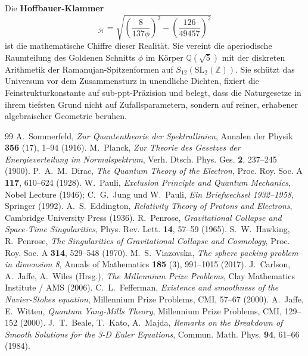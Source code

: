 \documentclass[11pt,a4paper]{article}
\theoremstyle{definition}
\theoremstyle{remark}
\numberwithin{equation}{section}
\begin{document}
Die \textbf{Hoffbauer-Klammer}
\begin{equation}
[D_r, D_t]_{\mathcal{H}} = \sqrt{\left(\frac{8}{137\phi}\right)^2 - \left(\frac{126}{49457}\right)^2}
\end{equation}
ist die mathematische Chiffre dieser Realität. Sie vereint die aperiodische Raumteilung des Goldenen Schnitts $\phi$ im Körper $\mathbb{Q}(\sqrt{5})$ mit der diskreten Arithmetik der Ramanujan-Spitzenformen auf $S_{12}(\mathrm{SL}_2(\mathbb{Z}))$. Sie schützt das Universum vor dem Zusammensturz in unendliche Dichten, fixiert die Feinstrukturkonstante auf sub-ppt-Präzision und belegt, dass die Naturgesetze in ihrem tiefsten Grund nicht auf Zufallsparametern, sondern auf reiner, erhabener algebraischer Geometrie beruhen.

\begin{thebibliography}{99}
 A.~Sommerfeld, \emph{Zur Quantentheorie der Spektrallinien}, Annalen der Physik \textbf{356} (17), 1--94 (1916).
 M.~Planck, \emph{Zur Theorie des Gesetzes der Energieverteilung im Normalspektrum}, Verh. Dtsch. Phys. Ges. \textbf{2}, 237--245 (1900).
 P.~A.~M.~Dirac, \emph{The Quantum Theory of the Electron}, Proc. Roy. Soc. A \textbf{117}, 610--624 (1928).
 W.~Pauli, \emph{Exclusion Principle and Quantum Mechanics}, Nobel Lecture (1946); C.~G.~Jung und W.~Pauli, \emph{Ein Briefwechsel 1932--1958}, Springer (1992).
 A.~S.~Eddington, \emph{Relativity Theory of Protons and Electrons}, Cambridge University Press (1936).
 R.~Penrose, \emph{Gravitational Collapse and Space-Time Singularities}, Phys. Rev. Lett. \textbf{14}, 57--59 (1965).
 S.~W.~Hawking, R.~Penrose, \emph{The Singularities of Gravitational Collapse and Cosmology}, Proc. Roy. Soc. A \textbf{314}, 529--548 (1970).
 M.~S.~Viazovska, \emph{The sphere packing problem in dimension 8}, Annals of Mathematics \textbf{185} (3), 991--1015 (2017).
 J.~Carlson, A.~Jaffe, A.~Wiles (Hrsg.), \emph{The Millennium Prize Problems}, Clay Mathematics Institute / AMS (2006).
 C.~L.~Fefferman, \emph{Existence and smoothness of the Navier-Stokes equation}, Millennium Prize Problems, CMI, 57--67 (2000).
 A.~Jaffe, E.~Witten, \emph{Quantum Yang-Mills Theory}, Millennium Prize Problems, CMI, 129--152 (2000).
 J.~T.~Beale, T.~Kato, A.~Majda, \emph{Remarks on the Breakdown of Smooth Solutions for the 3-D Euler Equations}, Commun. Math. Phys. \textbf{94}, 61--66 (1984).

\end{thebibliography}
\end{document}
